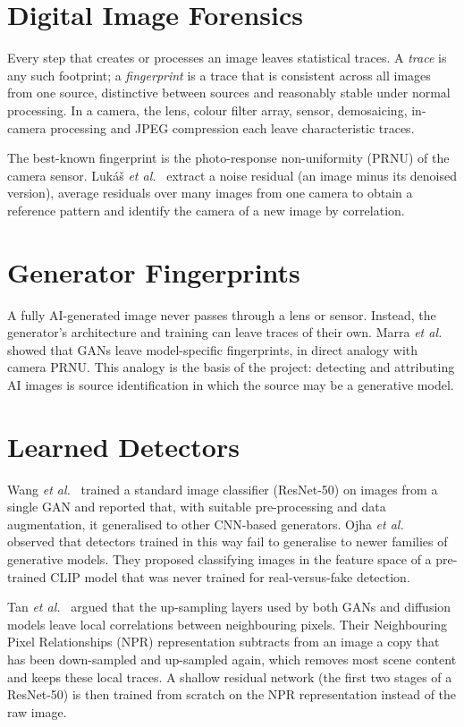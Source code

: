 \documentclass{mnnit}
\begin{document}
\section{Digital Image Forensics}
Every step that creates or processes an image leaves statistical
traces. A \emph{trace} is any such footprint; a \emph{fingerprint} is a
trace that is consistent across all images from one source, distinctive
between sources and reasonably stable under normal processing. In a
camera, the lens, colour filter array, sensor, demosaicing, in-camera
processing and JPEG compression each leave characteristic traces.

The best-known fingerprint is the photo-response non-uniformity (PRNU)
of the camera sensor. Luk\'{a}\v{s} \emph{et al.}~\cite{lukas2006prnu}
extract a noise residual (an image minus its denoised version), average
residuals over many images from one camera to obtain a reference pattern
and identify the camera of a new image by correlation.

\section{Generator Fingerprints}
A fully AI-generated image never passes through a lens or sensor.
Instead, the generator's architecture and training can leave traces of
their own. Marra \emph{et al.}~\cite{marra2019gans} showed that GANs
leave model-specific fingerprints, in direct analogy with camera PRNU.
This analogy is the basis of the project: detecting and attributing AI
images is source identification in which the source may be a
generative model.

\section{Learned Detectors}
Wang \emph{et al.}~\cite{wang2020cnn} trained a standard image
classifier (\mbox{ResNet-50}) on images from a single GAN and reported that,
with suitable pre-processing and data augmentation, it generalised to
other CNN-based generators. Ojha \emph{et al.}~\cite{ojha2023universal}
observed that detectors trained in this way fail to generalise to newer
families of generative models. They proposed classifying images in the
feature space of a pre-trained CLIP model that was never trained for
real-versus-fake detection.

Tan \emph{et al.}~\cite{tan2024npr} argued that the up-sampling layers
used by both GANs and diffusion models leave local correlations between
neighbouring pixels. Their Neighbouring Pixel Relationships (NPR)
representation subtracts from an image a copy that has been
down-sampled and up-sampled again, which removes most scene content and
keeps these local traces. A shallow residual network (the first two
stages of a \mbox{ResNet-50}) is then trained from scratch on the NPR
representation instead of the raw image.
\end{document}
